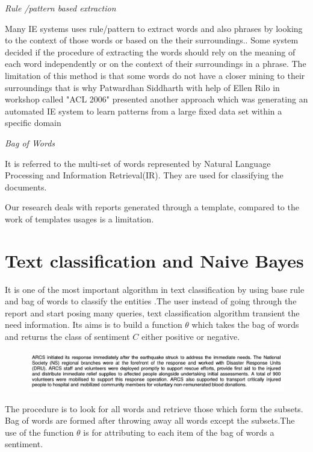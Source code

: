 \textit{Rule /pattern based extraction}

Many IE systems uses rule/pattern to extract words and also phrases by looking to the context of those words or based on the their surroundings.\citep{califf2003bottom}. Some system decided if the procedure of extracting the words should rely on the meaning of each word independently or on the context of their surroundings in a phrase.
The limitation of this method is that some words do not have a closer mining to their surroundings that is why Patwardhan Siddharth with help of Ellen Rilo  in workshop called "ACL 2006" presented another approach which  was  generating an automated IE system to learn patterns from a large fixed data set  within a specific domain \citep{patwardhan2007effective} 

\textit{Bag of Words} 

It is referred to the multi-set of words represented by Natural Language Processing and Information Retrieval(IR). They are used  for classifying the documents.

Our research deals with reports generated through a template, compared to the work of  \citep{patwardhan2007effective} templates usages is a limitation.

\section{Text classification and Naive Bayes}


It is one of the most important algorithm in text classification by using base rule and bag of words to classify the entities \citep{manning2012information}.The user instead of going through the report and start posing many queries, text classification algorithm transient the need information.
Its aims is to build a function $\theta$ which takes the bag of words and returns the class of sentiment $C$ either positive or negative.
\newpage
{\centering{$\theta$}

\centering{$\Updownarrow$}   

\begin{figure}[hbtp]
\centering
\includegraphics[scale=0.4]{images/report.png}\label{report}
\end{figure}

{\centering{$\Updownarrow$}}

{}

The procedure is to look for all words and retrieve those which form the subsets.  Bag of words are formed after throwing away  all words except the subsets.The use of the function $\theta$  is for  attributing  to each item of the bag of words a sentiment.}

